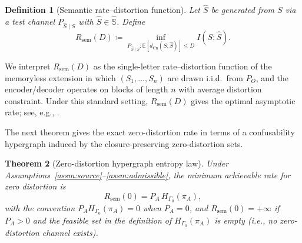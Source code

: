 \documentclass[twoside]{article}
\newtheorem{theorem}{Theorem}[section]
\newtheorem{definition}[theorem]{Definition}
\newcommand{\Cn}{\mathrm{Cn}}
\newcommand{\sem}{\mathrm{sem}}
\newcommand{\E}{\mathbb{E}}
\newcommand{\1}{\mathbf{1}}
\begin{document}
\begin{definition}[Semantic rate--distortion function]
\label{def:rsem}
Let \(\hat{S}\) be generated from \(S\) via a test channel \(P_{\hat{S}\mid S}\) with \(\hat{S}\in\hat{\mathbb{S}}\).
Define
\[
R_{\sem}(D) \coloneqq
\inf_{P_{\hat{S}\mid S}: \E[d_{\Cn}(S,\hat{S})]\le D} I(S;\hat{S}).
\]
\end{definition}

We interpret \(R_{\sem}(D)\) as the single-letter rate--distortion function of the memoryless extension in which
\((S_1,\dots,S_n)\) are drawn i.i.d.\ from \(P_O\), and the encoder/decoder operates on blocks of length \(n\) with average distortion constraint.
Under this standard setting, \(R_{\sem}(D)\) gives the optimal asymptotic rate; see, e.g., \cite{cover2006elements,csizsar2011information}.

The next theorem gives the exact zero-distortion rate in terms of a confusability hypergraph induced by the closure-preserving zero-distortion sets.

\begin{theorem}[Zero-distortion hypergraph entropy law]
\label{thm:zero}
Under Assumptions~\ref{assm:source}--\ref{assm:admissible}, the minimum achievable rate for zero distortion is
\[
R_{\sem}(0)=P_A \, H_{\Gamma_0}(\pi_A),
\]
with the convention \(P_A H_{\Gamma_0}(\pi_A)=0\) when \(P_A=0\), and
\(R_{\sem}(0)=+\infty\) if \(P_A>0\) and the feasible set in the definition of
\(H_{\Gamma_0}(\pi_A)\) is empty (i.e., no zero-distortion channel exists).
\end{theorem}
\end{document}
